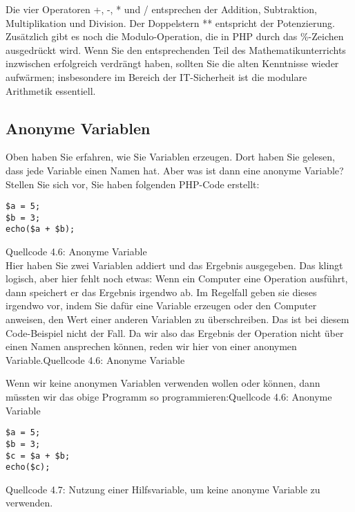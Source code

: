 Die vier Operatoren +, -, * und / entsprechen der Addition, Subtraktion, Multiplikation und Division. Der Doppelstern ** entspricht der Potenzierung.\\

Zusätzlich gibt es noch die Modulo-Operation, die in PHP durch das \%-Zeichen ausgedrückt wird. Wenn Sie den entsprechenden Teil des Mathematikunterrichts inzwischen erfolgreich verdrängt haben, sollten Sie die alten Kenntnisse wieder aufwärmen; insbesondere im Bereich der IT-Sicherheit ist die modulare Arithmetik essentiell.

\subsection{Anonyme Variablen}

Oben haben Sie erfahren, wie Sie Variablen erzeugen. Dort haben Sie gelesen, dass jede Variable einen Namen hat. Aber was ist dann eine anonyme Variable?\\

Stellen Sie sich vor, Sie haben folgenden PHP-Code erstellt:\\

\begin{verbatim}
$a = 5;
$b = 3;
echo($a + $b);
\end{verbatim}
Quellcode 4.6: Anonyme Variable\\

Hier haben Sie zwei Variablen addiert und das Ergebnis ausgegeben. Das klingt logisch, aber hier fehlt noch etwas: Wenn ein Computer eine Operation ausführt, dann speichert er das Ergebnis irgendwo ab. Im Regelfall geben sie dieses \glqq{}irgendwo\grqq{} vor, indem Sie dafür eine Variable erzeugen oder den Computer anweisen, den Wert einer anderen Variablen zu überschreiben. Das ist bei diesem Code-Beispiel nicht der Fall. Da wir also das Ergebnis der Operation nicht über einen Namen ansprechen können, reden wir hier von einer anonymen Variable.Quellcode 4.6: Anonyme Variable

Wenn wir keine anonymen Variablen verwenden wollen oder können, dann müssten wir das obige Programm so programmieren:Quellcode 4.6: Anonyme Variable

\begin{verbatim}
$a = 5;
$b = 3;
$c = $a + $b;
echo($c);
\end{verbatim}
Quellcode 4.7: Nutzung einer Hilfsvariable, um keine anonyme Variable zu verwenden.\\

